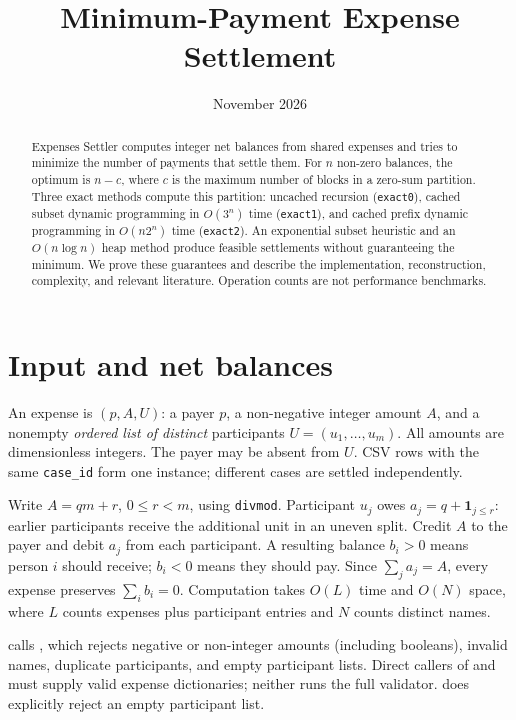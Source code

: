 \documentclass[11pt]{article}
\title{Minimum-Payment Expense Settlement}
\author{}
\date{November 2026}
\begin{document}
\maketitle
\begin{abstract}
Expenses Settler computes integer net balances from shared expenses and
tries to minimize the number of payments that settle them. For $n$
non-zero balances, the optimum is $n-c$, where $c$ is the maximum number
of blocks in a zero-sum partition. Three exact methods compute this
partition: uncached recursion (\texttt{exact0}), cached subset dynamic
programming in $O(3^n)$ time (\texttt{exact1}), and cached prefix dynamic
programming in $O(n2^n)$ time (\texttt{exact2}). An exponential subset
heuristic and an $O(n\log n)$ heap method produce feasible settlements
without guaranteeing the minimum. We prove these guarantees and describe
the implementation, reconstruction, complexity, and relevant literature.
Operation counts are not performance benchmarks.
\end{abstract}

\section{Input and net balances}\label{sec:balances}
An expense is $(p,A,U)$: a payer $p$, a non-negative integer amount $A$,
and a nonempty \emph{ordered list of distinct} participants
$U=(u_1,\ldots,u_m)$. All amounts are dimensionless integers. The payer
may be absent from $U$. CSV rows with the same \texttt{case\_id} form one
instance; different cases are settled independently.

Write $A=qm+r$, $0\leq r<m$, using \texttt{divmod}. Participant $u_j$
owes $a_j=q+\mathbf{1}_{j\leq r}$: earlier participants receive the
additional unit in an uneven split. Credit $A$ to the payer and debit
$a_j$ from each participant. A resulting balance $b_i>0$ means person
$i$ should receive; $b_i<0$ means they should pay. Since $\sum_j a_j=A$,
every expense preserves $\sum_i b_i=0$. Computation takes $O(L)$ time and
$O(N)$ space, where $L$ counts expenses plus participant entries and $N$
counts distinct names.

 calls , which rejects negative
or non-integer amounts (including booleans), invalid names, duplicate
participants, and empty participant lists. Direct callers of
 and  must supply valid expense
dictionaries; neither runs the full validator.  does
explicitly reject an empty participant list.
\end{document}
